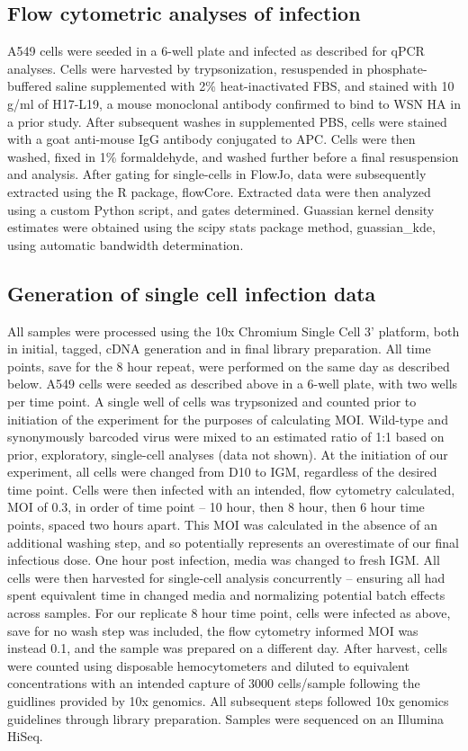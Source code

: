 \documentclass[9pt,lineno]{elife}
\begin{document}
\subsection{Flow cytometric analyses of infection}
A549 cells were seeded in a 6-well plate and infected as described for qPCR analyses.
Cells were harvested by trypsonization, resuspended in phosphate-buffered saline supplemented with 2\% heat-inactivated FBS, and stained with 10  \si{\micro}g/ml of H17-L19, a mouse monoclonal antibody confirmed to bind to WSN HA in a prior study.
After subsequent washes in supplemented PBS, cells were stained with a goat anti-mouse IgG antibody conjugated to APC.
Cells were then washed, fixed in 1\% formaldehyde, and washed further before a final resuspension and analysis. 
After gating for single-cells in FlowJo, data were subsequently extracted using the R package, flowCore.
Extracted data were then analyzed using a custom Python script, and gates determined.
Guassian kernel density estimates were obtained using the scipy stats package method, guassian\_kde, using automatic bandwidth determination.

\subsection{Generation of single cell infection data}
All samples were processed using the 10x Chromium Single Cell 3' platform, both in initial, tagged, cDNA generation and in final library preparation.
All time points, save for the 8 hour repeat, were performed on the same day as described below.
A549 cells were seeded as described above in a 6-well plate, with two wells per time point. 
A single well of cells was trypsonized and counted prior to initiation of the experiment for the purposes of calculating MOI.
Wild-type and synonymously barcoded virus were mixed to an estimated ratio of 1:1 based on prior, exploratory, single-cell analyses (data not shown). 
At the initiation of our experiment, all cells were changed from D10 to IGM, regardless of the desired time point.
Cells were then infected with an intended, flow cytometry calculated, MOI of 0.3, in order of time point -- 10 hour, then 8 hour, then 6 hour time points, spaced two hours apart.
This MOI was calculated in the absence of an additional washing step, and so potentially represents an overestimate of our final infectious dose.
One hour post infection, media was changed to fresh IGM.
All cells were then harvested for single-cell analysis concurrently -- ensuring all had spent equivalent time in changed media and normalizing potential batch effects across samples.
For our replicate 8 hour time point, cells were infected as above, save for no wash step was included, the flow cytometry informed MOI was instead 0.1, and the sample was prepared on a different day.
After harvest, cells were counted using disposable hemocytometers and diluted to equivalent concentrations with an intended capture of 3000 cells/sample following the guidlines provided by 10x genomics.
All subsequent steps followed 10x genomics guidelines through library preparation.
Samples were sequenced on an Illumina HiSeq. 
\end{document}
